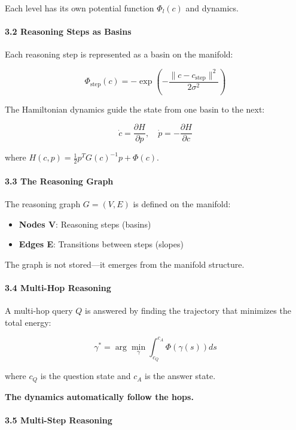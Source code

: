 \documentclass[
  11pt,
  a4paper,
]{article}
\providecommand{\tightlist}{%
  \setlength{\itemsep}{0pt}\setlength{\parskip}{0pt}}
\begin{document}
Each level has its own potential function \(\Phi_l(c)\) and dynamics.

\paragraph{3.2 Reasoning Steps as
Basins}\label{reasoning-steps-as-basins}

Each reasoning step is represented as a basin on the manifold:

\[
\Phi_{\text{step}}(c) = -\exp\left(-\frac{\|c - c_{\text{step}}\|^2}{2\sigma^2}\right)
\]

The Hamiltonian dynamics guide the state from one basin to the next:

\[
\dot{c} = \frac{\partial H}{\partial p}, \quad \dot{p} = -\frac{\partial H}{\partial c}
\]

where \(H(c, p) = \frac{1}{2} p^T G(c)^{-1} p + \Phi(c)\).

\paragraph{3.3 The Reasoning Graph}\label{the-reasoning-graph}

The reasoning graph \(G = (V, E)\) is defined on the manifold:

\begin{itemize}
\tightlist
\item
  \textbf{Nodes V}: Reasoning steps (basins)
\item
  \textbf{Edges E}: Transitions between steps (slopes)
\end{itemize}

The graph is not stored---it emerges from the manifold structure.

\paragraph{3.4 Multi-Hop Reasoning}\label{multi-hop-reasoning-1}

A multi-hop query \(Q\) is answered by finding the trajectory that
minimizes the total energy:

\[
\gamma^* = \arg\min_{\gamma} \int_{c_Q}^{c_A} \Phi(\gamma(s)) ds
\]

where \(c_Q\) is the question state and \(c_A\) is the answer state.

\textbf{The dynamics automatically follow the hops.}

\paragraph{3.5 Multi-Step Reasoning}\label{multi-step-reasoning}
\end{document}
